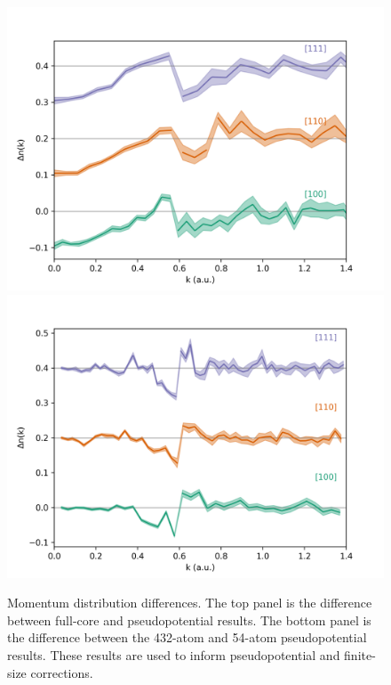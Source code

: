 \documentclass[aps,prb,showpacs,preprintnumbers,amsmath,amssymb,superscriptaddress,twocolumn]{revtex4}
\begin{document}
\begin{figure}
\includegraphics[width=\linewidth]{figures/li57_fc-ppc-dir}
\includegraphics[width=\linewidth]{figures/li52f_bfd-crystal-n54-n432-dnk}
\caption{Momentum distribution differences. The top panel is the difference between full-core and pseudopotential results. The bottom panel is the difference between the 432-atom and 54-atom pseudopotential results. These results are used to inform pseudopotential and finite-size corrections. \label{fig:dnk}}
\end{figure}
\end{document}
